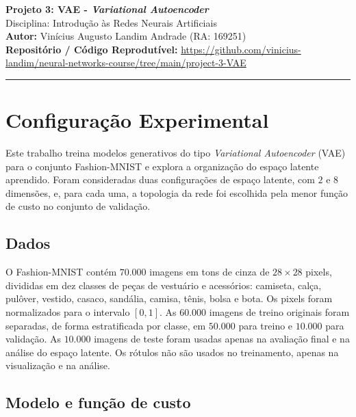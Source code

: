 \documentclass[11pt,a4paper]{article}
\begin{document}
\begin{center}
    {\LARGE \textbf{Projeto 3: VAE - \emph{Variational Autoencoder}}} \\[0.35em]
    {\large Disciplina: Introdução às Redes Neurais Artificiais} \\[0.3em]
    \textbf{Autor:} Vinícius Augusto Landim Andrade (RA: 169251) \\[0.2em]
    \textbf{Repositório / Código Reprodutível:} \url{https://github.com/vinicius-landim/neural-networks-course/tree/main/project-3-VAE}
\end{center}
\vspace{-0.5em}
\hrule
\vspace{0.8em}

\section{Configuração Experimental}

Este trabalho treina modelos generativos do tipo \textit{Variational Autoencoder}
(VAE) para o conjunto Fashion-MNIST e explora a organização do espaço latente
aprendido. Foram consideradas duas configurações de espaço latente, com
$2$ e $8$ dimensões, e, para cada uma, a topologia da rede foi escolhida pela
menor função de custo no conjunto de validação.

\subsection{Dados}

O Fashion-MNIST contém $70.000$ imagens em tons de cinza de $28 \times 28$ pixels,
divididas em dez classes de peças de vestuário e acessórios: camiseta, calça,
pulôver, vestido, casaco, sandália, camisa, tênis, bolsa e bota. Os pixels foram
normalizados para o intervalo $[0,1]$. As $60.000$ imagens de treino originais
foram separadas, de forma estratificada por classe, em $50.000$ para treino e
$10.000$ para validação. As $10.000$ imagens de teste foram usadas apenas na
avaliação final e na análise do espaço latente. Os rótulos não são usados no
treinamento, apenas na visualização e na análise.

\subsection{Modelo e função de custo}
\end{document}

